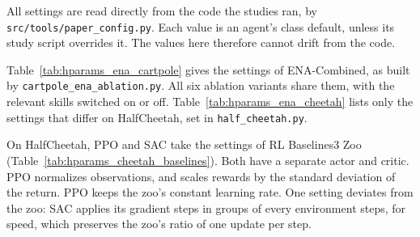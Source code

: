 All settings are read directly from the code the studies ran, by \texttt{src/tools/paper\_config.py}. Each value is an agent's class default, unless its study script overrides it. The values here therefore cannot drift from the code.

Table~\ref{tab:hparams_ena_cartpole} gives the settings of ENA-Combined, as built by \texttt{cartpole\_ena\_ablation.py}. All six ablation variants share them, with the relevant skills switched on or off. Table~\ref{tab:hparams_ena_cheetah} lists only the settings that differ on HalfCheetah, set in \texttt{half\_cheetah.py}.

On HalfCheetah, PPO and SAC take the settings of RL Baselines3 Zoo~\citep{raffin2020rlzoo} (Table~\ref{tab:hparams_cheetah_baselines}). Both have a separate actor and critic. PPO normalizes observations, and scales rewards by the standard deviation of the return. PPO keeps the zoo's constant learning rate. One setting deviates from the zoo: SAC applies its gradient steps in groups of  every  environment steps, for speed, which preserves the zoo's ratio of one update per step.

